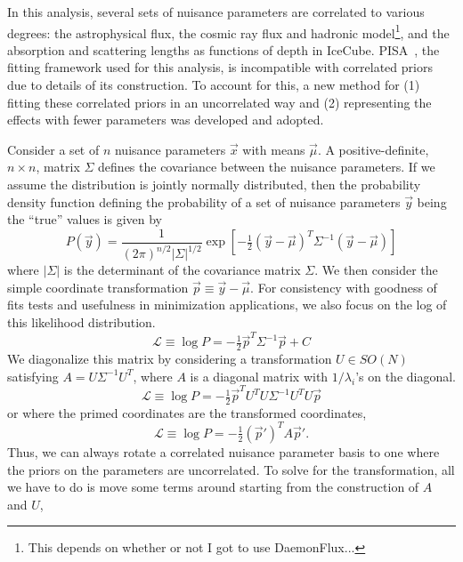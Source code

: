 \documentclass[main.tex]{subfiles}
\begin{document}
In this analysis, several sets of nuisance parameters are correlated to various degrees: the astrophysical flux, the cosmic ray flux and hadronic model\footnote{This depends on whether or not I got to use DaemonFlux...}, and the absorption and scattering lengths as functions of depth in IceCube. 
PISA~\cite{pisa}, the fitting framework used for this analysis, is incompatible with correlated priors due to details of its construction. 
To account for this, a new method for (1) fitting these correlated priors in an uncorrelated way and (2) representing the effects with fewer parameters was developed and adopted. 

Consider a set of $n$ nuisance parameters $\vec{x}$ with means $\vec{\mu}$.
A positive-definite, $n\times n$, matrix $\Sigma$ defines the covariance between the nuisance parameters. 
If we assume the distribution is jointly normally distributed, then the probability density function defining the probability of a set of nuisance parameters $\vec{y}$ being the ``true'' values is given by
\begin{equation}
    P(\vec{y}) = \dfrac{1}{(2\pi)^{n/2}\left|\Sigma\right|^{1/2}}\exp\left[-\tfrac{1}{2}(\vec{y}-\vec{\mu})^{T}\Sigma^{-1}\left(\vec{y}-\vec{\mu}\right)\right]
\end{equation}
where $\left|\Sigma\right|$ is the determinant of the covariance matrix $\Sigma$. 
We then consider the simple coordinate transformation $ \vec{p}\equiv \vec{y}-\vec{\mu}$.
For consistency with goodness of fits tests and usefulness in minimization applications, we also focus on the log of this likelihood distribution. 
\begin{equation}
\mathcal{L} \equiv \log P = -\tfrac{1}{2}\vec{p}^{T}\Sigma^{-1}\vec{p} + C
\end{equation}
We diagonalize this matrix by considering a transformation $U\in SO(N)$ satisfying $A = U\Sigma^{-1}U^{T}$, where $A$ is a diagonal matrix with $1/\lambda_{i}$'s on the diagonal. 
\begin{equation}
    \mathcal{L} \equiv \log P = -\tfrac{1}{2}\vec{p}^{T} U^{T} U\Sigma^{-1} U^{T} U\vec{p}
\end{equation}
or where the primed coordinates are the transformed coordinates,
\begin{equation}
    \mathcal{L} \equiv \log P = -\tfrac{1}{2}(\vec{p}')^{T} A \vec{p}'.
\end{equation}
Thus, we can always rotate a correlated nuisance parameter basis to one where the priors on the parameters are uncorrelated. 
To solve for the transformation, all we have to do is move some terms around starting from the construction of $A$ and $U$, 
\end{document}
